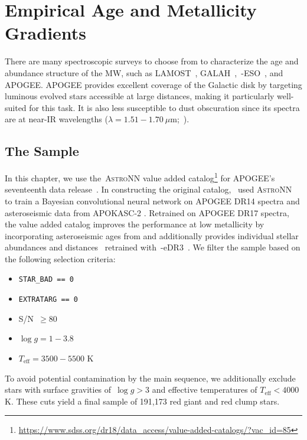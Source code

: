 
\section{Empirical Age and Metallicity Gradients}
\label{outflows:sec:empirical}

There are many spectroscopic surveys to choose from to characterize the age and
abundance structure of the MW, such as LAMOST~\citep{Luo2015},
GALAH~\citep{DeSilva2015, Martell2017},~\gaia-ESO~\citep{Gilmore2012}, and
APOGEE\space\citep{Majewski2017}.
APOGEE provides excellent coverage of the Galactic disk by targeting luminous
evolved stars accessible at large distances, making it particularly well-suited
for this task.
It is also less susceptible to dust obscuration since its spectra are at
near-IR wavelengths ($\lambda = 1.51 - 1.70~\mu$m;~\citealt{Wilson2019}).

\subsection{The Sample}
\label{outflows:sec:empirical:sample}
In this chapter, we use the~\textsc{AstroNN} value added catalog\footnote{
	\url{https://www.sdss.org/dr18/data_access/value-added-catalogs/?vac_id=85}
} for APOGEE's seventeenth data release~\citep[DR17;][]{Abdurrouf2022}.
In constructing the original catalog,~\citet{Mackereth2019b} used
\textsc{AstroNN}~\citep{Leung2019a} to train a Bayesian convolutional neural
network on APOGEE DR14 spectra and asteroseismic data from APOKASC-2
\citep{Pinsonneault2018}.
Retrained on APOGEE DR17 spectra, the value added catalog improves the
performance at low metallicity by incorporating asteroseismic ages from
\citet{Montalban2021} and additionally provides individual stellar abundances
\citep{Leung2019a} and distances~\citep{Leung2019b} retrained
with~\gaia-eDR3~\citep{GaiaCollaboration2021}.
We filter the sample based on the following selection criteria:
\begin{itemize}

	\item \texttt{STAR\_BAD == 0}

	\item \texttt{EXTRATARG == 0}

	\item S/N~$\geq 80$

	\item $\log g = 1 - 3.8$

	\item $T_\text{eff} = 3500 - 5500$ K

\end{itemize}
To avoid potential contamination by the main sequence, we additionally exclude
stars with surface gravities of~$\log g > 3$ and effective temperatures of
$T_\text{eff} < 4000$ K.
These cuts yield a final sample of 191,173 red giant and red clump stars.

